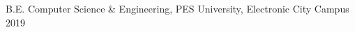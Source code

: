 

\begin{cvhonors}

  \cvhonor
    {B.E.} %
    {Computer Science \& Engineering, PES University, Electronic City Campus} %
    {} %
    {2019} %

\end{cvhonors}
